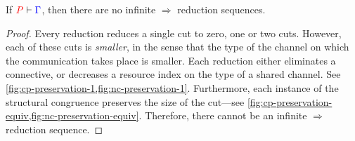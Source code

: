 \begin{theorem}[Termination]\label{thm:nc-termination}
  If $\seq[{ P }]{ \Gamma }$, then there are no infinite $\Longrightarrow$
  reduction sequences.
\end{theorem}
\begin{proof}
  Every reduction reduces a single cut to zero, one or two cuts.
  However, each of these cuts is \emph{smaller}, in the sense that the type of
  the channel on which the communication takes place is smaller.
  Each reduction either eliminates a connective, or decreases a resource index
  on the type of a shared channel.
  See \cref{fig:cp-preservation-1,fig:nc-preservation-1}.
  Furthermore, each instance of the structural congruence preserves the size
  of the cut---see \cref{fig:cp-preservation-equiv,fig:nc-preservation-equiv}.
  Therefore, there cannot be an infinite $\Longrightarrow$ reduction sequence.
\end{proof}
